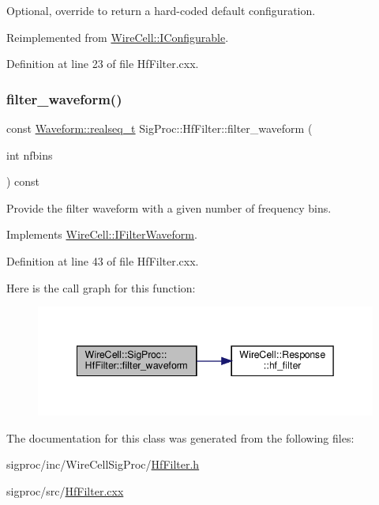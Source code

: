 Optional, override to return a hard-\/coded default configuration. 



Reimplemented from \hyperlink{class_wire_cell_1_1_i_configurable_a54841b2da3d1ea02189478bff96f7998}{Wire\+Cell\+::\+I\+Configurable}.



Definition at line 23 of file Hf\+Filter.\+cxx.

\mbox{\label{class_wire_cell_1_1_sig_proc_1_1_hf_filter_a4b34ce856b103ea1cfff4d418b1aae6d}} 
\subsubsection{\texorpdfstring{filter\+\_\+waveform()}{filter\_waveform()}}
{\footnotesize\ttfamily const \hyperlink{namespace_wire_cell_1_1_waveform_a479175e541c8545e87cd8063b74b6956}{Waveform\+::realseq\+\_\+t} Sig\+Proc\+::\+Hf\+Filter\+::filter\+\_\+waveform (\begin{DoxyParamCaption}\item[{int}]{nfbins }\end{DoxyParamCaption}) const\hspace{0.3cm}{\ttfamily [virtual]}}



Provide the filter waveform with a given number of frequency bins. 



Implements \hyperlink{class_wire_cell_1_1_i_filter_waveform_a7757f5772c9974a6c76bebcc856a3069}{Wire\+Cell\+::\+I\+Filter\+Waveform}.



Definition at line 43 of file Hf\+Filter.\+cxx.

Here is the call graph for this function\+:
\nopagebreak
\begin{figure}[H]
\begin{center}
\leavevmode
\includegraphics[width=342pt]{class_wire_cell_1_1_sig_proc_1_1_hf_filter_a4b34ce856b103ea1cfff4d418b1aae6d_cgraph}
\end{center}
\end{figure}


The documentation for this class was generated from the following files\+:\begin{DoxyCompactItemize}
\item 
sigproc/inc/\+Wire\+Cell\+Sig\+Proc/\hyperlink{_hf_filter_8h}{Hf\+Filter.\+h}\item 
sigproc/src/\hyperlink{_hf_filter_8cxx}{Hf\+Filter.\+cxx}\end{DoxyCompactItemize}
